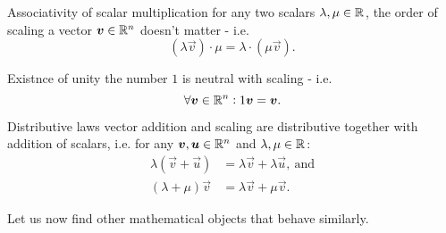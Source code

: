 \begin{descitemize}
    \item[Associativity of scalar multiplication] for any two scalars $\lambda,\mu\in\Rs$, the order of scaling a vector $\vec{v}\in\Rs[n]$ doesn't matter - i.e.
    \begin{equation}
        \left(\lambda\vec{v}\right)\cdot\mu = \lambda\cdot\left(\mu\vec{v}\right).
        \label{eq:scalar_multiplication_associative}
    \end{equation}

    \item[Existnce of unity] the number $1$ is neutral with scaling - i.e.
        \begin{equation}
            \forall \vec{v}\in\Rs[n]: 1\vec{v}=\vec{v}.
            \label{eq:scalar_multiplication_unity}
        \end{equation}

    \item[Distributive laws] vector addition and scaling are distributive together with addition of scalars, i.e. for any $\vec{v},\vec{u}\in\Rs[n]$ and $\lambda,\mu\in\Rs$:
        \begin{align}
            \lambda\left(\vec{v}+\vec{u}\right) &= \lambda\vec{v} + \lambda\vec{u},\ \text{and}\\ \left(\lambda+\mu\right)\vec{v} &= \lambda\vec{v} + \mu\vec{v}.
            \label{eq:label}
        \end{align}
\end{descitemize}

Let us now find other mathematical objects that behave similarly.
